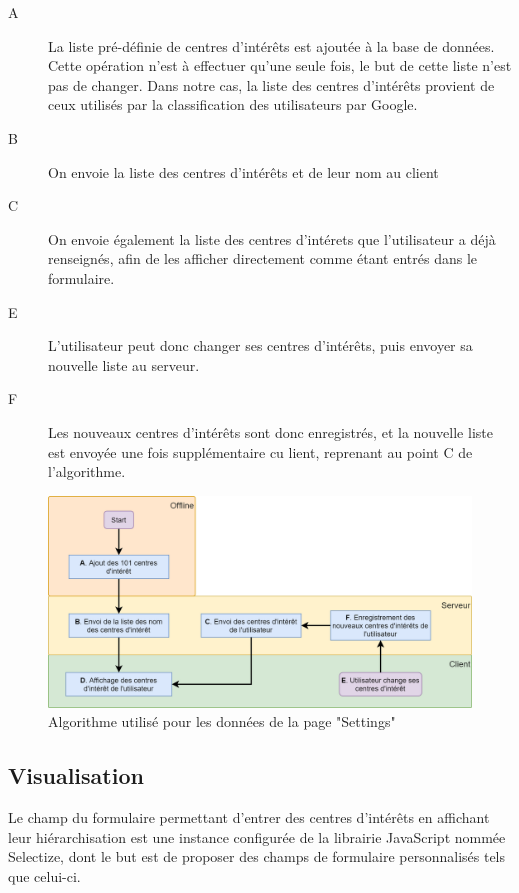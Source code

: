 		\begin{description}
			\item[A] La liste pré-définie de centres d'intérêts est ajoutée à la base de données. Cette opération n'est à effectuer qu'une seule fois, le but de cette liste n'est pas de changer. Dans notre cas, la liste des centres d'intérêts provient de ceux utilisés par la classification des utilisateurs par Google.

			\item[B] On envoie la liste des centres d'intérêts et de leur nom au client

			\item[C] On envoie également la liste des centres d'intérets que l'utilisateur a déjà renseignés, afin de les afficher directement comme étant entrés dans le formulaire.

			\item[E] L'utilisateur peut donc changer ses centres d'intérêts, puis envoyer sa nouvelle liste au serveur.

			\item[F] Les nouveaux centres d'intérêts sont donc enregistrés, et la nouvelle liste est envoyée une fois supplémentaire cu lient, reprenant au point C de l'algorithme.

		\end{description}

		\begin{figure}[!h]
			\centering
			\includegraphics[height=0.52\textwidth]{images/design/pages/settings_algo}
			\caption{Algorithme utilisé pour les données de la page "Settings"}
			\label{settings_algo}
		\end{figure}

	\subsection{Visualisation}

		Le champ du formulaire permettant d'entrer des centres d'intérêts en affichant leur hiérarchisation est une instance configurée de la librairie JavaScript nommée Selectize\cite{selectize}, dont le but est de proposer des champs de formulaire personnalisés tels que celui-ci.

\clearpage